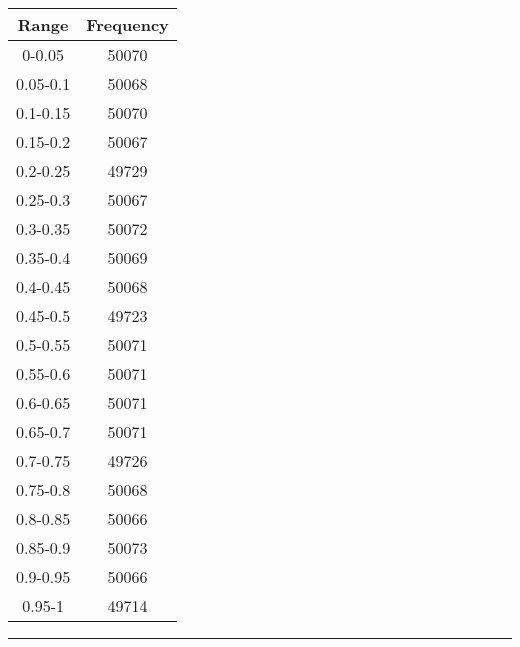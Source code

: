 \begin{center} \begin{tabular}{||c | c||}  \hline
Range & Frequency \\ [0.5ex] \hline \hline0-0.05 & 50070\\
 \hline 
0.05-0.1 & 50068\\
 \hline 
0.1-0.15 & 50070\\
 \hline 
0.15-0.2 & 50067\\
 \hline 
0.2-0.25 & 49729\\
 \hline 
0.25-0.3 & 50067\\
 \hline 
0.3-0.35 & 50072\\
 \hline 
0.35-0.4 & 50069\\
 \hline 
0.4-0.45 & 50068\\
 \hline 
0.45-0.5 & 49723\\
 \hline 
0.5-0.55 & 50071\\
 \hline 
0.55-0.6 & 50071\\
 \hline 
0.6-0.65 & 50071\\
 \hline 
0.65-0.7 & 50071\\
 \hline 
0.7-0.75 & 49726\\
 \hline 
0.75-0.8 & 50068\\
 \hline 
0.8-0.85 & 50066\\
 \hline 
0.85-0.9 & 50073\\
 \hline 
0.9-0.95 & 50066\\
 \hline 
0.95-1 & 49714\\
 \hline 
\end{tabular} 
 \end{center}

 \noindent\rule[0.5ex]{\linewidth}{1pt}

